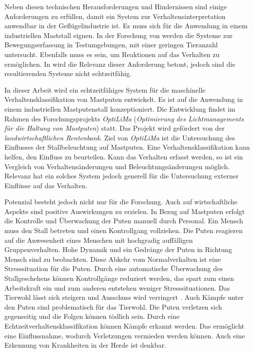 Neben diesen technischen Herausforderungen und Hindernissen sind einige Anforderungen zu erfüllen, damit ein System zur Verhaltensinterpretation anwendbar in der Geflügelindustrie ist. Es muss sich für die Anwendung in einem industriellen Maststall eignen. In der Forschung von \cite{Fang.2020, Ju.2021} werden die Systeme zur Bewegungserfassung in Testumgebungen, mit einer geringen Tieranzahl untersucht. Ebenfalls muss es  sein, um Reaktionen auf das Verhalten zu ermöglichen. In \cite{Chen.2023, Nasirahmadi.2020} wird die Relevanz dieser Anforderung betont, jedoch sind die resultierenden Systeme nicht echtzeitfähig. \par

In dieser Arbeit wird ein echtzeitfähiges System für die maschinelle Verhaltensklassifikation von Mastputen entwickelt. Es ist auf die Anwendung in einem industriellen Mastputenstall konzeptioniert. Die Entwicklung findet im Rahmen des Forschungsprojekts \textit{\acrshort{OptiLiMa}} (\textit{Optimierung des Lichtmanagements für die Haltung von Mastputen}) statt. Das Projekt wird gefördert von der \textit{landwirtschaftlichen Rentenbank}. Ziel von \textit{\acrshort{OptiLiMa}} ist die Untersuchung des Einflusses der Stallbeleuchtung auf Mastputen. Eine Verhaltensklassifikation kann helfen, den Einfluss zu beurteilen. Kann das Verhalten erfasst werden, so ist ein Vergleich von Verhaltensänderungen und Beleuchtungsänderungen möglich. Relevanz hat ein solches System jedoch generell für die Untersuchung externer Einflüsse auf das Verhalten.\par

Potenzial besteht jedoch nicht nur für die Forschung. Auch auf wirtschaftliche Aspekte sind positive Auswirkungen zu erzielen. In Bezug auf Mastputen erfolgt die Kontrolle und Überwachung der Puten manuell durch Personal. Ein Mensch muss den Stall betreten und einen Kontrollgang vollziehen. Die Puten reagieren auf die Anwesenheit eines Menschen mit hochgradig auffälligen Gruppenverhalten. Hohe Dynamik und ein Gedränge der Puten in Richtung Mensch sind zu beobachten. Diese Abkehr vom Normalverhalten ist eine Stresssituation für die Puten. Durch eine automatische Überwachung des Stallgeschehens können Kontrollgänge reduziert werden, das spart zum einen Arbeitskraft ein und zum anderen entstehen weniger Stresssituationen. Das Tierwohl lässt sich steigern und Ausschuss wird verringert \cite{Chen.2023, Garcia.2020}. Auch Kämpfe unter den Puten sind problematisch für das Tierwohl. Die Puten verletzen sich gegenseitig und die Folgen können tödlich sein. Durch eine Echtzeitverhaltensklassifikation können Kämpfe erkannt werden. Das ermöglicht eine Einflussnahme, wodurch Verletzungen vermieden werden können. Auch eine Erkennung von Krankheiten in der Herde ist denkbar.\par

